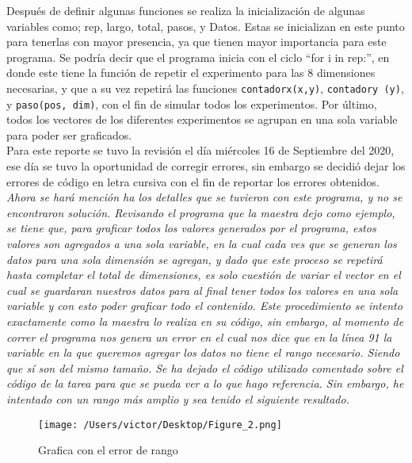 \documentclass{article}
\begin{document}
Después de definir algunas funciones se realiza la inicialización de algunas variables como; rep, largo, total, pasos, y Datos. Estas se inicializan en este punto para tenerlas con mayor presencia, ya que tienen mayor importancia para este programa. Se podría decir que el programa inicia con el ciclo “for i in rep:”, en donde este tiene la función de repetir el experimento para las 8 dimensiones necesarias, y que a su vez repetirá las funciones \texttt{contadorx(x,y)}, \texttt{contadory (y)}, y \texttt{paso(pos, dim)}, con el fin de simular todos los experimentos. Por último, todos los vectores de los diferentes experimentos se agrupan en una sola variable para poder ser graficados. \\

Para este reporte se tuvo la  revisión el día miércoles 16 de Septiembre del 2020\citep{DRA.CONV}, ese día se tuvo la oportunidad de corregir errores, sin embargo se  decidió dejar los errores de código en letra cursiva con el fin de reportar los errores obtenidos.\\

\textit{Ahora se hará mención ha los detalles que se tuvieron con este programa, y no se encontraron solución. Revisando el programa que la maestra dejo como ejemplo, se tiene que, para graficar todos los valores generados por el programa, estos valores son agregados a una sola variable, en la cual cada ves que se generan los datos para una sola dimensión se agregan, y dado que este proceso se repetirá hasta completar el total de dimensiones, es solo cuestión de variar el vector en el cual se guardaran nuestros datos para al final tener todos los valores en una sola variable y con esto poder graficar todo el contenido.  Este procedimiento se intento exactamente como la maestra lo realiza en su código, sin embargo, al momento de correr el programa nos genera un error en el cual nos dice que en la línea 91 la variable en la que queremos agregar los datos no tiene el rango necesario. Siendo que sí son del mismo tamaño. Se ha dejado el código utilizado comentado sobre el código de la tarea para que se pueda ver a lo que hago referencia. Sin embargo, he intentado con un rango más amplio y sea tenido el siguiente resultado.}\\

\begin{figure}[H]
\begin{center}
	\texttt{[image: /Users/victor/Desktop/Figure\_2.png]}
	\caption{Grafica con el error de rango}
	\label{fig:tarea.1}
\end{center}
\end{figure}
\end{document}

